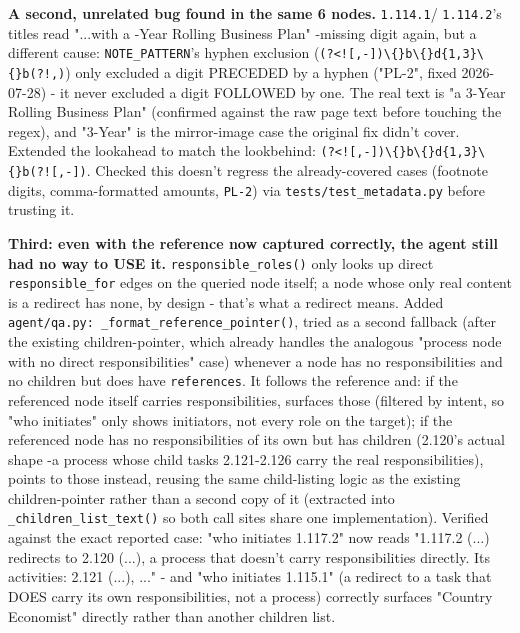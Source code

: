 \textbf{A second, unrelated bug found in the same 6 nodes.} \texttt{1.114.1}/ \texttt{1.114.2}'s titles read "...with a -Year Rolling Business Plan" -missing digit again, but a different cause: \texttt{NOTE\_\allowbreak{}PATTERN}'s hyphen exclusion (\texttt{(?<![,-])\textbackslash\{\}b\textbackslash\{\}d\{1,3\}\textbackslash\{\}b(?!,)}) only excluded a digit PRECEDED by a hyphen ("PL-2", fixed 2026-07-28) - it never excluded a digit FOLLOWED by one. The real text is "a 3-Year Rolling Business Plan" (confirmed against the raw page text before touching the regex), and "3-Year" is the mirror-image case the original fix didn't cover. Extended the lookahead to match the lookbehind: \texttt{(?<![,-])\textbackslash\{\}b\textbackslash\{\}d\{1,3\}\textbackslash\{\}b(?![,-])}. Checked this doesn't regress the already-covered cases (footnote digits, comma-formatted amounts, \texttt{PL-2}) via \texttt{tests/\allowbreak{}test\_\allowbreak{}metadata.py} before trusting it.

\textbf{Third: even with the reference now captured correctly, the agent still had no way to USE it.} \texttt{responsible\_\allowbreak{}roles()} only looks up direct \texttt{responsible\_\allowbreak{}for} edges on the queried node itself; a node whose only real content is a redirect has none, by design - that's what a redirect means. Added \texttt{agent/\allowbreak{}qa.py: \_\allowbreak{}format\_\allowbreak{}reference\_\allowbreak{}pointer()}, tried as a second fallback (after the existing children-pointer, which already handles the analogous "process node with no direct responsibilities" case) whenever a node has no responsibilities and no children but does have \texttt{references}. It follows the reference and: if the referenced node itself carries responsibilities, surfaces those (filtered by intent, so "who initiates" only shows initiators, not every role on the target); if the referenced node has no responsibilities of its own but has children (2.120's actual shape -a process whose child tasks 2.121-2.126 carry the real responsibilities), points to those instead, reusing the same child-listing logic as the existing children-pointer rather than a second copy of it (extracted into \texttt{\_\allowbreak{}children\_\allowbreak{}list\_\allowbreak{}text()} so both call sites share one implementation). Verified against the exact reported case: "who initiates 1.117.2" now reads "1.117.2 (...) redirects to 2.120 (...), a process that doesn't carry responsibilities directly. Its activities: 2.121 (...), ..." - and "who initiates 1.115.1" (a redirect to a task that DOES carry its own responsibilities, not a process) correctly surfaces "Country Economist" directly rather than another children list.

